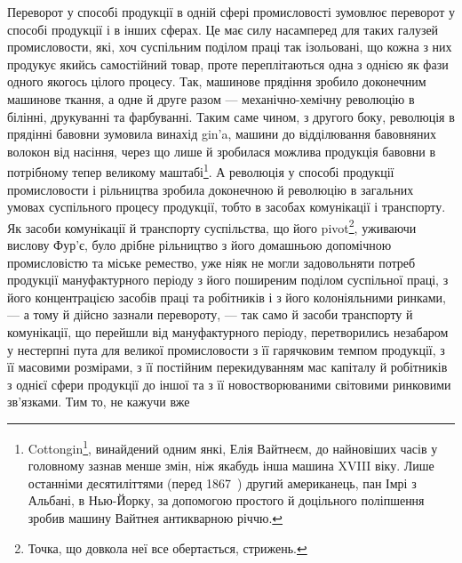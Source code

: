 Переворот у способі продукції в одній сфері промисловості
зумовлює переворот у способі продукції і в інших сферах. Це
має силу насамперед для таких галузей промисловости, які,
хоч суспільним поділом праці так ізольовані, що кожна з них
продукує якийсь самостійний товар, проте переплітаються одна
з однією як фази одного якогось цілого процесу. Так, машинове
прядіння зробило доконечним машинове ткання, а одне й друге
разом — механічно-хемічну революцію в білінні, друкуванні
та фарбуванні. Таким саме чином, з другого боку, революція в
прядінні бавовни зумовила винахід gin’a, машини до відділювання
бавовняних волокон від насіння, через що лише й зробилася
можлива продукція бавовни в потрібному тепер великому маштабі\footnote{
Cottongin\footnote*{
Машина, що вибирає зерно з бавовни. 
}, винайдений одним янкі, Елія Вайтнеєм, до найновіших
часів у головному зазнав менше змін, ніж якабудь інша машина XVIII віку.
Лише останніми десятиліттями (перед 1867~) другий американець, пан
Імрі з Альбані, в Нью-Йорку, за допомогою простого й доцільного
поліпшення зробив машину Вайтнея антикварною річчю.
}.
А революція у способі продукції промисловости і рільництва
зробила доконечною й революцію в загальних умовах суспільного
процесу продукції, тобто в засобах комунікації і транспорту.
Як засоби комунікації й транспорту суспільства, що його
pivot\footnote*{
Точка, що довкола неї все обертається, стрижень. 
}, уживаючи вислову Фур’є, було дрібне рільництво з його
домашньою допомічною промисловістю та міське ремество, уже
ніяк не могли задовольняти потреб продукції мануфактурного
періоду з його поширеним поділом суспільної праці, з його концентрацією
засобів праці та робітників і з його колоніяльними
ринками, — а тому й дійсно зазнали перевороту, — так само й
засоби транспорту й комунікації, що перейшли від мануфактурного
періоду, перетворились незабаром у нестерпні пута для
великої промисловости з її гарячковим темпом продукції, з її масовими
розмірами, з її постійним перекидуванням мас капіталу й
робітників з однієї сфери продукції до іншої та з її новостворюваними
світовими ринковими зв’язками. Тим то, не кажучи вже
\parbreak{}  %
